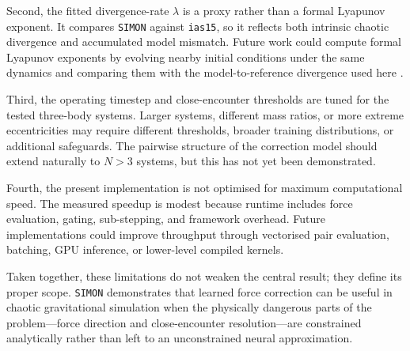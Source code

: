 \documentclass[12pt]{article}
\begin{document}
Second, the fitted divergence-rate $\lambda$ is a proxy rather than a formal Lyapunov
exponent. It compares \texttt{SIMON} against \texttt{ias15}, so it reflects both intrinsic
chaotic divergence and accumulated model mismatch. Future work could compute formal
Lyapunov exponents by evolving nearby initial conditions under the same dynamics and
comparing them with the model-to-reference divergence used here \citep{sep-chaos}.

Third, the operating timestep and close-encounter thresholds are tuned for the tested
three-body systems. Larger systems, different mass ratios, or more extreme eccentricities
may require different thresholds, broader training distributions, or additional safeguards.
The pairwise structure of the correction model should extend naturally to $N>3$ systems,
but this has not yet been demonstrated.

Fourth, the present implementation is not optimised for maximum computational speed.
The measured speedup is modest because runtime includes force evaluation, gating,
sub-stepping, and framework overhead. Future implementations could improve throughput
through vectorised pair evaluation, batching, GPU inference, or lower-level compiled
kernels.

Taken together, these limitations do not weaken the central result; they define its proper
scope. \texttt{SIMON} demonstrates that learned force correction can be useful in chaotic
gravitational simulation when the physically dangerous parts of the problem---force
direction and close-encounter resolution---are constrained analytically rather than left
to an unconstrained neural approximation.

\newpage




\end{document}
